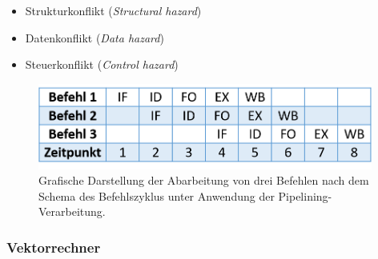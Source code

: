 				\begin{itemize}
					\item Strukturkonflikt (\textit{Structural hazard})
					\item Datenkonflikt (\textit{Data hazard})
					\item Steuerkonflikt (\textit{Control hazard}) \cite{AufbauFunktionsweiseMikroprozessoren} \cite{RechnerorganisationUndEntwurf}
				\end{itemize}

				\begin{figure}
					\centering	
					\includegraphics[width=11cm]{Abbildungen/Befehlszylus_mit_Pipelining.png}
					\caption{Grafische Darstellung der Abarbeitung von drei Befehlen nach dem Schema des Befehlszyklus unter Anwendung der Pipelining-Verarbeitung.}
					\label{fig:BefehlszylusMitPipelining}
				\end{figure}
			
			\subsubsection{Vektorrechner}
				\label{Vektorrechner}
				
